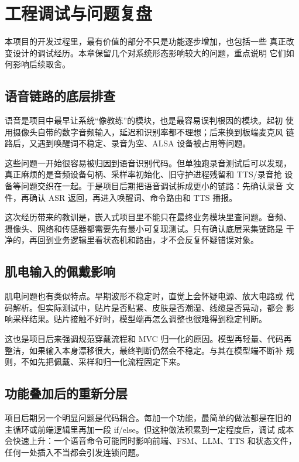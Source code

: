 \section{工程调试与问题复盘}
\label{sec:debug}

本项目的开发过程里，最有价值的部分不只是功能逐步增加，也包括一些
真正改变设计的调试经历。本章保留几个对系统形态影响较大的问题，重点说明
它们如何影响后续取舍。

\subsection{语音链路的底层排查}

语音是项目中最早让系统“像教练”的模块，也是最容易误判根因的模块。起初
使用摄像头自带的数字音频输入，延迟和识别率都不理想；后来换到板端麦克风
链路后，又遇到唤醒词不稳定、录音为空、ALSA 设备被占用等问题。

这些问题一开始很容易被归因到语音识别代码。但单独跑录音测试后可以发现，
真正麻烦的是音频设备句柄、采样率初始化、旧守护进程残留和 TTS/录音抢
设备等问题交织在一起。于是项目后期把语音调试拆成更小的链路：先确认录音
文件，再确认 ASR 返回，再进入唤醒词、命令路由和 TTS 播报。

这次经历带来的教训是，嵌入式项目里不能只在最终业务模块里查问题。音频、
摄像头、网络和传感器都需要先有最小可复现测试。只有确认底层采集链路是
干净的，再回到业务逻辑里看状态机和路由，才不会反复怀疑错误对象。

\subsection{肌电输入的佩戴影响}

肌电问题也有类似特点。早期波形不稳定时，直觉上会怀疑电源、放大电路或
代码解析。但实际测试中，贴片是否贴紧、皮肤是否潮湿、线缆是否晃动，都会
影响采样结果。贴片接触不好时，模型端再怎么调整也很难得到稳定判断。

这也是项目后来强调规范穿戴流程和 MVC 归一化的原因。模型再轻量、代码再
整洁，如果输入本身漂移很大，最终判断仍然会不稳定。与其在模型端不断补
规则，不如先把佩戴、采样和归一化流程固定下来。

\subsection{功能叠加后的重新分层}

项目后期另一个明显问题是代码耦合。每加一个功能，最简单的做法都是在旧的
主循环或前端逻辑里再加一段 if/else。但这种做法积累到一定程度后，调试
成本会快速上升：一个语音命令可能同时影响前端、FSM、LLM、TTS 和状态文件，
任何一处插入不当都会引发连锁问题。

